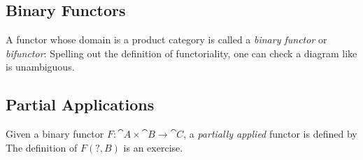 \subsection{Binary Functors}

A functor whose domain is a product category
is called a \textit{binary functor} or \textit{bifunctor}:
Spelling out the definition of functoriality, one can check a diagram like
is unambiguous.

\subsection{Partial Applications}

Given a binary functor $F : \cat{A} \times \cat{B} \to \cat{C}$, a \textit{partially applied} functor
is defined by
The definition of $F(?,B)$ is an exercise. 



